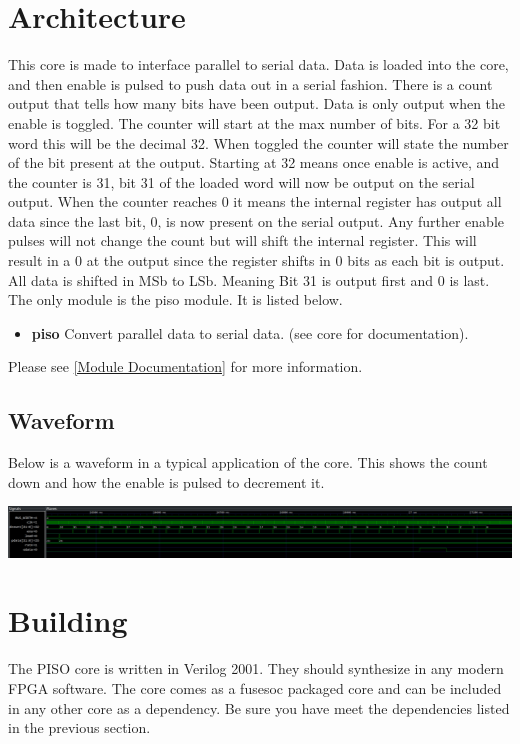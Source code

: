 \section{Architecture}
\par
This core is made to interface parallel to serial data. Data is loaded into the core, and then enable is pulsed to
push data out in a serial fashion. There is a count output that tells how many bits have been output. Data is only output
when the enable is toggled. The counter will start at the max number of bits. For a 32 bit word this will be the decimal 32.
When toggled the counter will state the number of the bit present at the output. Starting at 32 means once enable is active,
and the counter is 31, bit 31 of the loaded word will now be output on the serial output. When the counter reaches 0 it means
the internal register has output all data since the last bit, 0, is now present on the serial output. Any further enable
pulses will not change the count but will shift the internal register. This will result in a 0 at the output since the register
shifts in 0 bits as each bit is output. All data is shifted in MSb to LSb. Meaning Bit 31 is output first and 0 is last.
The only module is the piso module. It is listed below.

\begin{itemize}
  \item \textbf{piso} Convert parallel data to serial data. (see core for documentation).
\end{itemize}

Please see \ref{Module Documentation} for more information.

\subsection{Waveform}
Below is a waveform in a typical application of the core. This shows the count down and how the enable is pulsed to decrement it.

\includegraphics[width=\textwidth]{src/diagrams/waveform.png}

\section{Building}

\par
The PISO core is written in Verilog 2001. They should synthesize in any modern FPGA software. The core comes as a fusesoc packaged core and can be included in any other core as a dependency. Be sure you have meet the dependencies listed in the previous section.

